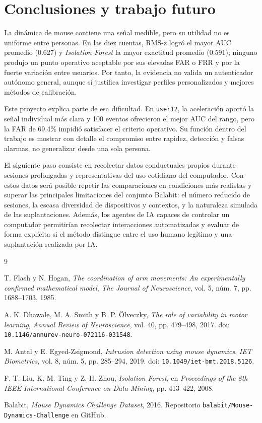 \documentclass[11pt,letterpaper]{article}
\begin{document}
\section{Conclusiones y trabajo futuro}

La dinámica de mouse contiene una señal medible, pero su utilidad no es uniforme entre personas. En las diez cuentas,
RMS-z logró el mayor AUC promedio (0.627) y \emph{Isolation Forest} la mayor exactitud promedio (0.591); ninguno produjo un
punto operativo aceptable por sus elevadas FAR o FRR y por la fuerte variación entre usuarios. Por tanto, la evidencia
no valida un autenticador autónomo general, aunque sí justifica investigar perfiles personalizados y mejores métodos de
calibración.

Este proyecto explica parte de esa dificultad. En \texttt{user12}, la aceleración aportó la señal individual más
clara y 100 eventos ofrecieron el mejor AUC del rango, pero la FAR de 69.4\% impidió satisfacer el criterio operativo.
Su función dentro del trabajo es mostrar con detalle el compromiso entre rapidez, detección y falsas alarmas, no
generalizar desde una sola persona.

El siguiente paso consiste en recolectar datos conductuales propios durante sesiones prolongadas y representativas del
uso cotidiano del computador. Con estos datos será posible repetir las comparaciones en condiciones más realistas y
superar las principales limitaciones del conjunto Balabit: el número reducido de sesiones, la escasa diversidad de
dispositivos y contextos, y la naturaleza simulada de las suplantaciones. Además, los agentes de IA capaces de
controlar un computador permitirían recolectar interacciones automatizadas y evaluar de forma explícita si el método
distingue entre el uso humano legítimo y una suplantación realizada por IA.

\begin{thebibliography}{9}
\raggedright

T. Flash y N. Hogan,
\emph{The coordination of arm movements: An experimentally confirmed mathematical model},
\textit{The Journal of Neuroscience}, vol. 5, núm. 7, pp. 1688--1703, 1985.

A. K. Dhawale, M. A. Smith y B. P. Ölveczky,
\emph{The role of variability in motor learning},
\textit{Annual Review of Neuroscience}, vol. 40, pp. 479--498, 2017.
doi: \texttt{10.1146/annurev-neuro-072116-031548}.

M. Antal y E. Egyed-Zsigmond,
\emph{Intrusion detection using mouse dynamics},
\textit{IET Biometrics}, vol. 8, núm. 5, pp. 285--294, 2019.
doi: \texttt{10.1049/iet-bmt.2018.5126}.

F. T. Liu, K. M. Ting y Z.-H. Zhou,
\emph{Isolation Forest},
en \textit{Proceedings of the 8th IEEE International Conference on Data Mining}, pp. 413--422, 2008.

Balabit,
\emph{Mouse Dynamics Challenge Dataset}, 2016.
Repositorio \texttt{balabit/Mouse-Dynamics-Challenge} en GitHub.

\end{thebibliography}
\end{document}
